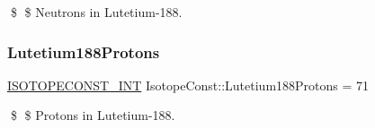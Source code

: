 \$ \$ Neutrons in Lutetium-\/188. \mbox{\label{group___isotope_const-_lutetium-_lu188_ga3f1034ee98df70565f68b20574898092}} 
\subsubsection{\texorpdfstring{Lutetium188\+Protons}{Lutetium188Protons}}
{\footnotesize\ttfamily \mbox{\hyperlink{group___isotope_const-_macros_ga5f18360b3e99483a35c32d789e62621c}{I\+S\+O\+T\+O\+P\+E\+C\+O\+N\+S\+T\+\_\+\+I\+NT}} Isotope\+Const\+::\+Lutetium188\+Protons = 71}

\$ \$ Protons in Lutetium-\/188. 